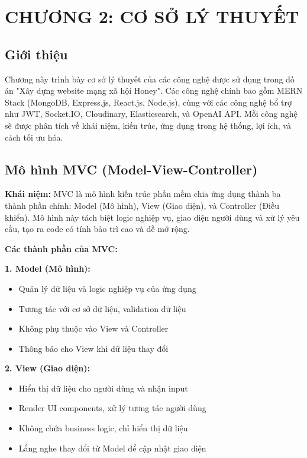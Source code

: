 \newpage

\section{\textbf{CHƯƠNG 2: CƠ SỞ LÝ THUYẾT  }}



\subsection{Giới thiệu}
Chương này trình bày cơ sở lý thuyết của các công nghệ được sử dụng trong đồ án "Xây dựng website mạng xã hội Honey". Các công nghệ chính bao gồm MERN Stack (MongoDB, Express.js, React.js, Node.js), cùng với các công nghệ bổ trợ như JWT, Socket.IO, Cloudinary, Elasticsearch, và OpenAI API. Mỗi công nghệ sẽ được phân tích về khái niệm, kiến trúc, ứng dụng trong hệ thống, lợi ích, và cách tối ưu hóa.

\subsection{Mô hình MVC (Model-View-Controller)}

\textbf{Khái niệm:}
MVC là mô hình kiến trúc phần mềm chia ứng dụng thành ba thành phần chính: Model (Mô hình), View (Giao diện), và Controller (Điều khiển). Mô hình này tách biệt logic nghiệp vụ, giao diện người dùng và xử lý yêu cầu, tạo ra code có tính bảo trì cao và dễ mở rộng.

\textbf{Các thành phần của MVC:}

\textbf{1. Model (Mô hình):}
\begin{itemize}
\item Quản lý dữ liệu và logic nghiệp vụ của ứng dụng
\item Tương tác với cơ sở dữ liệu, validation dữ liệu
\item Không phụ thuộc vào View và Controller
\item Thông báo cho View khi dữ liệu thay đổi
\end{itemize}

\textbf{2. View (Giao diện):}
\begin{itemize}
\item Hiển thị dữ liệu cho người dùng và nhận input
\item Render UI components, xử lý tương tác người dùng
\item Không chứa business logic, chỉ hiển thị dữ liệu
\item Lắng nghe thay đổi từ Model để cập nhật giao diện
\end{itemize}

